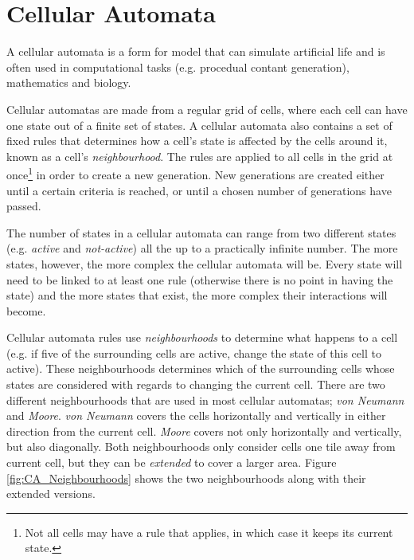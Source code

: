 \section{Cellular Automata}
\label{methodology_ca}
A cellular automata is a form for model that can simulate artificial life and is often used in computational tasks (e.g. procedual contant generation\cite{togelius2011search}), mathematics and biology. 

Cellular automatas are made from a regular grid of cells, where each cell can have one state out of a finite set of states. A cellular automata also contains a set of fixed rules that determines how a cell's state is affected by the cells around it, known as a cell's \textit{neighbourhood}. The rules are applied to all cells in the grid at once\footnote{Not all cells may have a rule that applies, in which case it keeps its current state.} in order to create a new generation. New generations are created either until a certain criteria is reached, or until a chosen number of generations have passed.

The number of states in a cellular automata can range from two different states (e.g. \textit{active} and \textit{not-active}) all the up to a practically infinite number. The more states, however, the more complex the cellular automata will be. Every state will need to be linked to at least one rule (otherwise there is no point in having the state) and the more states that exist, the more complex their interactions will become.

Cellular automata rules use \textit{neighbourhoods} to determine what happens to a cell (e.g. if five of the surrounding cells are active, change the state of this cell to active). These neighbourhoods determines which of the surrounding cells whose states are considered with regards to changing the current cell. There are two different neighbourhoods that are used in most cellular automatas; \textit{von Neumann} and \textit{Moore}. \textit{von Neumann} covers the cells horizontally and vertically in either direction from the current cell. \textit{Moore} covers not only horizontally and vertically, but also diagonally. Both neighbourhoods only consider cells one tile away from current cell, but they can be \textit{extended} to cover a larger area. Figure \ref{fig:CA_Neighbourhoods} shows the two neighbourhoods along with their extended versions.


